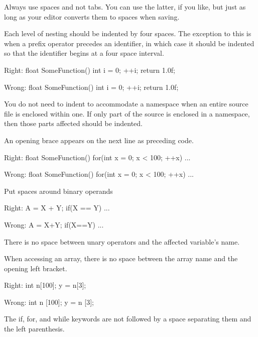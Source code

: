 \item
Always use spaces and not tabs. You can use the latter, if you like, but just as long as your editor converts them to spaces when saving.

\item
Each level of nesting should be indented by four spaces. The exception to this is when a prefix operator precedes an identifier, in which case it should be indented so that the identifier begins at a four space interval.

Right:
\startCodeExample
float SomeFunction()
{
    int i = 0;
  ++i;
    return 1.0f;
}
\stopCodeExample

Wrong:
\startCodeExample
float SomeFunction()
{
    int i = 0;
    ++i;
        return 1.0f;
}
\stopCodeExample

\item
You do not need to indent to accommodate a namespace when an entire source file is enclosed within one. If only part of the source is enclosed in a namespace, then those parts affected should be indented.

\item
An opening brace appears on the next line as preceding code.

Right:
\startCodeExample
float SomeFunction()
{
    for(int x = 0; x < 100; ++x)
    {
        ...
    }
}
\stopCodeExample

Wrong:
\startCodeExample
float SomeFunction() {
    for(int x = 0; x < 100; ++x) {
        ...
    }
}
\stopCodeExample

\item
Put spaces around binary operands

Right:
\startCodeExample
A = X + Y;
if(X == Y)
    ...
\stopCodeExample

Wrong:
\startCodeExample
A = X+Y;
if(X==Y)
    ...
\stopCodeExample

\item
There is no space between unary operators and the affected variable's name.

\item
When accessing an array, there is no space between the array name and the opening left bracket. 

Right:
\startCodeExample
int n[100];
y = n[3];
\stopCodeExample

Wrong:
\startCodeExample
int n [100];
y = n [3];
\stopCodeExample

\item
The if, for, and while keywords are not followed by a space separating them and the left parenthesis. 


